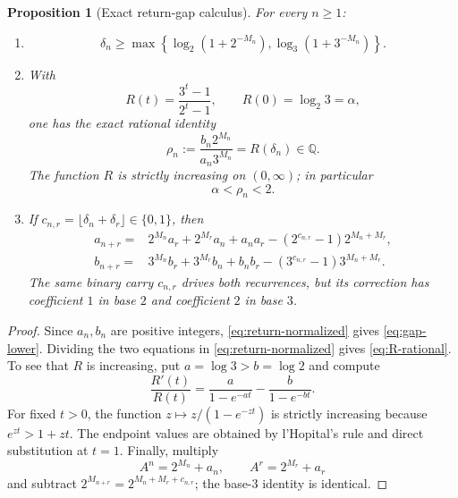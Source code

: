 \documentclass[11pt]{article}
\newtheorem{proposition}[theorem]{Proposition}
\theoremstyle{definition}
\theoremstyle{remark}
\newcommand{\QQ}{\mathbb Q}
\begin{document}
\begin{proposition}[Exact return-gap calculus]\label{prop:return-calculus}
For every $n\ge1$:
\begin{enumerate}
\item
\begin{equation}\label{eq:gap-lower}
 \delta_n\ge
 \max\left\{
 \log_2(1+2^{-M_n}),
 \log_3(1+3^{-M_n})
 \right\}.
\end{equation}
\item With
\[
 R(t)=\frac{3^t-1}{2^t-1},\qquad R(0)=\log_2 3=\alpha,
\]
one has the exact rational identity
\begin{equation}\label{eq:R-rational}
 \rho_n:=\frac{b_n2^{M_n}}{a_n3^{M_n}}=R(\delta_n)\in\QQ.
\end{equation}
The function $R$ is strictly increasing on $(0,\infty)$; in particular
\[
 \alpha<\rho_n<2.
\]
\item If $c_{n,r}=\lfloor\delta_n+\delta_r\rfloor\in\{0,1\}$, then
\begin{align}
 a_{n+r}={}&2^{M_n}a_r+2^{M_r}a_n+a_na_r
 -(2^{c_{n,r}}-1)2^{M_n+M_r},\label{eq:a-recurrence}\\
 b_{n+r}={}&3^{M_n}b_r+3^{M_r}b_n+b_nb_r
 -(3^{c_{n,r}}-1)3^{M_n+M_r}.
 \label{eq:b-recurrence}
\end{align}
The same binary carry $c_{n,r}$ drives both recurrences, but its correction has coefficient $1$ in base $2$ and coefficient $2$ in base $3$.
\end{enumerate}
\end{proposition}

\begin{proof}
Since $a_n,b_n$ are positive integers, \eqref{eq:return-normalized} gives \eqref{eq:gap-lower}. Dividing the two equations in \eqref{eq:return-normalized} gives \eqref{eq:R-rational}. To see that $R$ is increasing, put $a=\log3>b=\log2$ and compute
\[
 \frac{R'(t)}{R(t)}=
 \frac{a}{1-e^{-at}}-\frac{b}{1-e^{-bt}}.
\]
For fixed $t>0$, the function $z\mapsto z/(1-e^{-zt})$ is strictly increasing because $e^{zt}>1+zt$. The endpoint values are obtained by l'Hopital's rule and direct substitution at $t=1$. Finally, multiply
\[
 A^n=2^{M_n}+a_n,\qquad A^r=2^{M_r}+a_r
\]
and subtract $2^{M_{n+r}}=2^{M_n+M_r+c_{n,r}}$; the base-$3$ identity is identical.
\end{proof}
\end{document}
